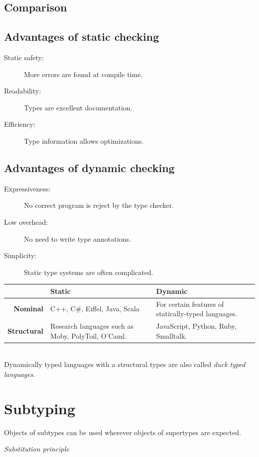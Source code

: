 \subsection{Comparison}

\subsection{Advantages of static checking}
\begin{description}
 \item[Static safety:] More errors are found at compile time.
 \item[Readability:] Types are excellent documentation.
 \item[Efficiency:] Type information allows optimizations.
\end{description}
\subsection{Advantages of dynamic checking}
\begin{description}
 \item[Expressiveness:] No correct program is reject by the type checker.
 \item[Low overhead:] No need to write type annotations.
 \item[Simplicity:] Static type systems are often complicated.
\end{description}

\begin{tabular}{r|p{5cm}p{5cm}}
& \textbf{Static} & \textbf{Dynamic}\\ \hline
\textbf{Nominal} & C++, C\#, Eiffel, Java, Scala & For certain features of statically-typed languages.\\
\textbf{Structural}& Research languages such as Moby, PolyToil, O'Caml. & JavaScript, Python, Ruby, Smalltalk.
\end{tabular}\\

Dynamically typed languages with a structural types are also called \emph{duck typed languages}.

\section{Subtyping}

\begin{shadequote}
  Objects of subtypes can be used wherever objects of supertypes are expected.\par\emph{Substitution principle}
\end{shadequote}

